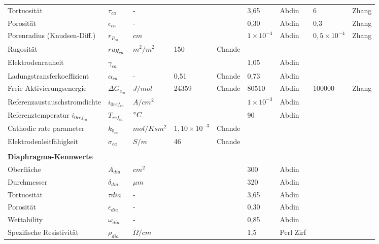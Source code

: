 \documentclass[onecolumn,10pt,titlepage]{article}
\begin{document}
\begin{table}[]
\begin{tabular*}{\textwidth}{lllllllll}
		Tortuosität 							& $\tau_{ca}$	 		& -	 				& 	 		& 			& 3,65 					& Abdin 	& 6 					& Zhang 	\\
		Porosität 								& $\epsilon_{ca}$		& -	 				& 	 		& 			& 0,30 					& Abdin 	& 0,3 					& Zhang 	\\
		Porenradius (Knudsen-Diff.) 			& $r_{P_{ca}}$			& $cm$ 				& 	 		& 	 		& $1\times{10^{-4}}$	& Abdin 	& $0,5\times{10^{-4}}$ 	& Zhang 	\\
		Rugosität 								& $rug_{ca}$			& $m^{2}/m^{2}$		& 150 		& Chande	& 	 					& 		 	& 	 					&	 		\\
		Elektrodenrauheit 						& $\gamma_{ca}$ 		& 	 				& 	 		& 	 		& 1,05 					& Abdin 	& 	 					& 	 		\\
		
		Ladungstransferkoeffizient 				& $\alpha_{ca}$ 		& - 				& 0,51 		& Chande	& 0,73 					& Abdin 	& 	 					& 	 		\\
		Freie Aktivierungsenergie 				& ${\Delta}G_{c_{ca}}$ 	& $J/mol$		    & 24359		& Chande	& 80510 				& Abdin 	& 100000 				& Zhang 	\\
		Referenzaustauschstromdichte			& $i_{0ref_{ca}}$ 		& $A/cm^{2}$		& 	 		& 	 		& $1\times{10^{-3}}$ 	& Abdin 	& 	 					& 	 		\\
		Referenztemperatur $i_{0ref_{ca}}$ 		& $T_{ref_{ca}}$ 		& $\degree{C}$	 	& 	 		& 	 		& 90 					& Abdin 	& 	 					& 	 		\\
		Cathodic rate parameter					& $k_{0_{ca}}$			& $mol/Ksm^{2}$		& $1,10\times{10^{-3}}$ & Chande 				&&			& 						& 	 		\\
		Elektrodenleitfähigkeit					& $\sigma_{ca}$ 		& $S/m$				& 46	 	& Chande	& 	 					&  			& 	 					& 	 		\\
		
		&&&&&&&& \\
		\textbf{Diaphragma-Kennwerte}&&&&&&&& \\
		Oberfläche 								& $A_{dia}$ 			& $cm^{2}$ 			&&& 300 	& Abdin		&&\\
		Durchmesser 							& $\delta_{dia}$ 		& $\mu{m}$ 			&&& 320 	& Abdin		&&\\
		Tortuosität 							& $\tau{dia}$			& - 				&&& 3,65 	& Abdin		&&\\
		Porosität 								& $\epsilon_{dia}$ 		& - 				&&& 0,30 	& Abdin		&&\\
		Wettability 							& $\omega_{dia}$ 		& - 				&&& 0,85 	& Abdin		&&\\
		Spezifische Resistivität 				& $\rho_{dia}$ 			& ${\Omega}/cm$ 	&&& 1,5 	& Perl Zirf &&\\
		

\end{tabular*}
\end{table}
\end{document}
